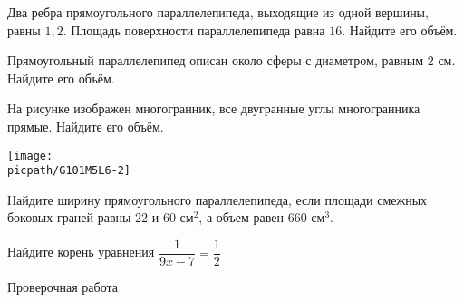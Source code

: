 \begin{homework}[number=3]
	\begin{listofex}
		\item Два ребра прямоугольного параллелепипеда, выходящие из одной вершины, равны \(1, 2\). Площадь поверхности параллелепипеда равна \(16\). Найдите его объём.
		\item Прямоугольный параллелепипед описан около сферы с диаметром, равным \(2\) см. Найдите его объём.
		\item 
		\begin{minipage}[t]{\bodywidth}
			На рисунке изображен многогранник, все двугранные углы многогранника прямые. Найдите его объём.
		\end{minipage}
		\hspace{0.02\linewidth}
		\begin{minipage}[t]{\picwidth}
			\texttt{[image: \\picpath/G101M5L6-2]}
		\end{minipage}
		\item Найдите ширину прямоугольного параллелепипеда, если площади смежных боковых граней равны \(22\) и \(60\) см\(^2\), а объем равен \(660\) см\(^3\).
		\item Найдите корень уравнения \(\dfrac{1}{9x-7}=\dfrac{1}{2}\)
	\end{listofex}
\end{homework}

\begin{exam}
	\begin{listofex}
		\item Проверочная работа
	\end{listofex}
\end{exam}
